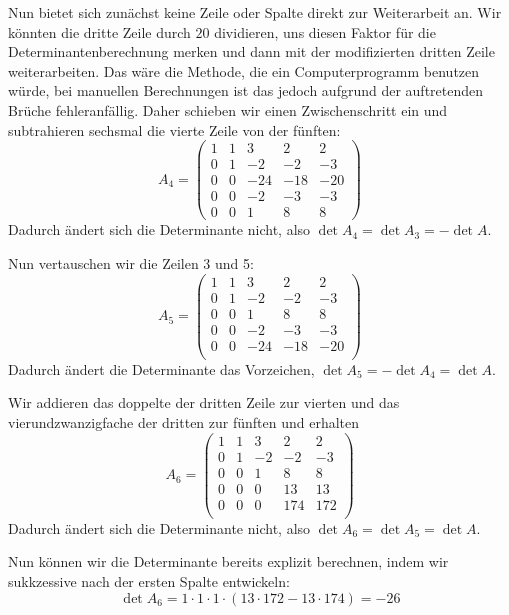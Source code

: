 \begin{beispiel}
Nun bietet sich zunächst keine Zeile oder Spalte direkt zur Weiterarbeit an. Wir könnten die dritte Zeile durch $20$ 
dividieren, uns diesen Faktor für die Determinantenberechnung merken und dann mit der modifizierten dritten Zeile 
weiterarbeiten. Das wäre die Methode, die ein Computerprogramm benutzen würde, bei manuellen Berechnungen 
ist das jedoch aufgrund der auftretenden Brüche fehleranfällig. Daher schieben wir einen Zwischenschritt ein und 
subtrahieren sechsmal die vierte Zeile von der fünften:
 	$$ A_4 = \left( \begin{matrix} 1 & 1 & 3 & 2 & 2 \\ 0 & 1 & -2 & - 2 & -3\\ 
    	0 & 0 & -24 & -18 & -20 \\0 & 0 & -2 & -3 & -3  \\ 0 & 0 & 1 & 8 & 8  \end{matrix} \right) $$
Dadurch ändert sich die  Determinante nicht, also $\det{A_4} = \det{A_3} = - \det{A} $. 

Nun vertauschen wir die Zeilen 3 und 5:
 	$$ A_5 = \left( \begin{matrix} 1 & 1 & 3 & 2 & 2 \\ 0 & 1 & -2 & - 2 & -3\\  0 & 0 & 1 & 8 & 8 \\
  	0 & 0 & -2 & -3 & -3 \\ 0 & 0 & -24 & -18 & -20 \\   \end{matrix} \right) $$
Dadurch ändert die Determinante das Vorzeichen, $\det{A_5} = -\det{A_4} =  \det{A} $.

Wir addieren das doppelte der dritten Zeile zur vierten und das vierundzwanzigfache der dritten zur fünften und erhalten
  	$$ A_6 = \left( \begin{matrix} 1 & 1 & 3 & 2 & 2 \\ 0 & 1 & -2 & - 2 & -3\\  0 & 0 & 1 & 8 & 8 \\
 	0 & 0 & 0 & 13 & 13 \\ 0 & 0 & 0 & 174 & 172 \\   \end{matrix}  \right) $$
Dadurch ändert sich die  Determinante nicht, also $\det{A_6} = \det{A_5} = \det{A}$. 

Nun können wir die Determinante bereits explizit berechnen, indem wir sukkzessive nach der ersten Spalte entwickeln:
  	$$  \det{A_6} = 1 \cdot 1 \cdot 1 \cdot \left( 13 \cdot 172 - 13 \cdot 174 \right) = -26 $$


\end{beispiel}
